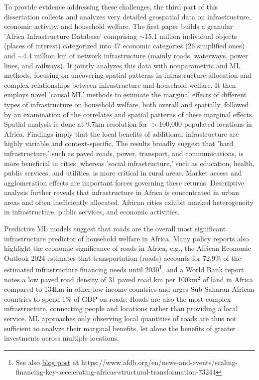 \documentclass[a4paper]{article}
\begin{document}
To provide evidence addressing these challenges, the third part of this dissertation collects and analyzes very detailed geospatial data on infrastructure, economic activity, and household welfare. The first paper \citep{krantz2023mapping} builds a granular 'Africa Infrastructure Database' comprising $\sim$15.1 million individual objects (places of interest) categorized into 47 economic categories (26 simplified ones) and $\sim$4.4 million km of network infrastructure (mainly roads, waterways, power lines, and railways). It jointly analyzes this data with nonparametric and ML methods, focusing on uncovering spatial patterns in infrastructure allocation and complex relationships between infrastructure and household welfare. It then employs novel 'causal ML' methods to estimate the marginal effects of different types of infrastructure on household welfare, both overall and spatially, followed by an examination of the correlates and spatial patterns of these marginal effects. Spatial analysis is done at 9.7km resolution for $>$100,000 populated locations in Africa. Findings imply that the local benefits of additional infrastructure are highly variable and context-specific. The results broadly suggest that 'hard infrastructure,' such as paved roads, power, transport, and communications, is more beneficial in cities, whereas 'social infrastructure,' such as education, health, public services, and utilities, is more critical in rural areas. Market access and agglomeration effects are important forces governing these returns. Descriptive analysis further reveals that infrastructure in Africa is concentrated in urban areas and often inefficiently allocated. African cities exhibit marked heterogeneity in infrastructure, public services, and economic activities. \newline 

Predictive ML models suggest that roads are the overall most significant infrastructure predictor of household welfare in Africa. Many policy reports also highlight the economic significance of roads in Africa, e.g., the African Economic Outlook 2024 \citep{african2024driving} estimates that transportation (roads) accounts for 72.9\% of the estimated infrastructure financing needs until 2030\footnote{See also \href{https://www.afdb.org/en/news-and-events/scaling-financing-key-accelerating-africas-structural-transformation-73244}{blog post} at https://www.afdb.org/en/news-and-events/scaling-financing-key-accelerating-africas-structural-transformation-73244 \vspace{-3mm}}, and a World Bank report \citep{foster2010africa} notes a low paved road density of 31 paved road km per 100km$^2$ of land in Africa compared to 134km in other low-income countries and urges Sub-Saharan African countries to spend 1\% of GDP on roads. Roads are also the most complex infrastructure, connecting people and locations rather than providing a local service. ML approaches only observing local quantities of roads are thus not sufficient to analyze their marginal benefits, let alone the benefits of greater investments across multiple locations. \newline
\end{document}
